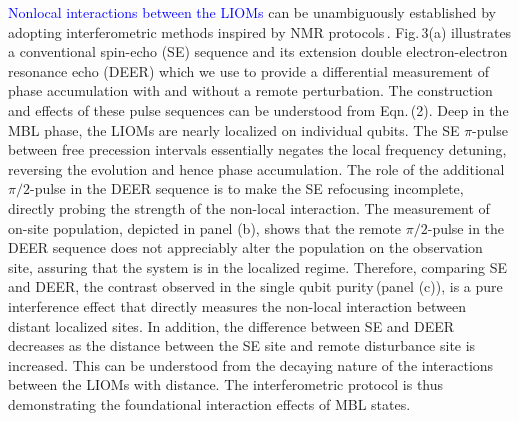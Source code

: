 \textcolor{blue}{Nonlocal interactions between the LIOMs} can be unambiguously established by adopting interferometric methods inspired by NMR protocols\,\cite{KnapPRL2014}.  Fig.\,3(a) illustrates a conventional spin-echo (SE) sequence and its extension double electron-electron resonance echo (DEER) which we use to provide a differential measurement of phase accumulation with and without a remote perturbation. The construction and effects of these pulse sequences can be understood from Eqn.\,(2). Deep in the MBL phase, the LIOMs are nearly localized on individual qubits. The SE $\pi$-pulse between free precession intervals essentially negates the local frequency detuning, reversing the evolution and hence phase accumulation. The role of the additional $\pi/2$-pulse in the DEER sequence is to make the SE refocusing incomplete, directly probing the strength of the non-local interaction. The measurement of on-site population, depicted in panel (b), shows that the remote $\pi / 2$-pulse in the DEER sequence does not appreciably alter the population on the observation site, assuring that the system is in the localized regime. Therefore, comparing SE and DEER, the contrast observed in the single qubit purity\,(panel (c)), is a pure interference effect that directly measures the non-local interaction between distant localized sites. In addition, the difference between SE and DEER decreases as the distance between the SE site and remote disturbance site is increased. This can be understood from the decaying nature of the interactions between the LIOMs with distance. The interferometric protocol is thus demonstrating the foundational interaction effects of MBL states.

